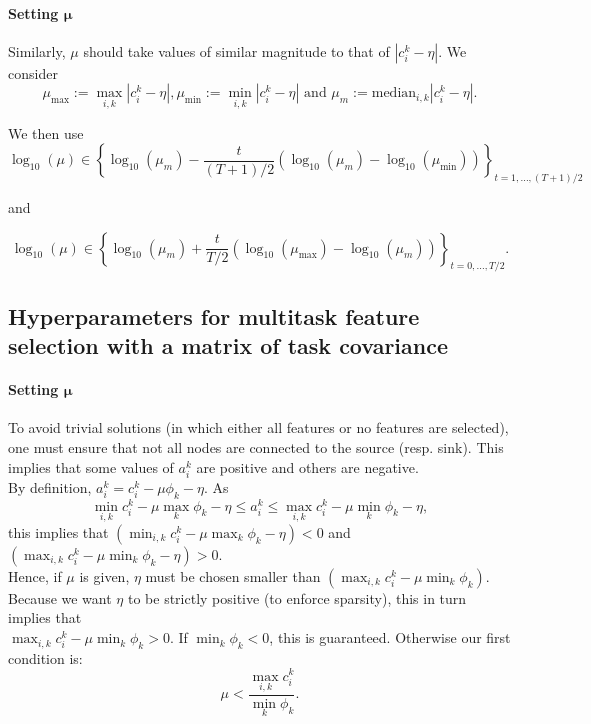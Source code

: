 \documentclass[12pt,a4paper]{article}
\begin{document}
\paragraph{Setting $\pmb{\mu}$} Similarly, $\mu$ should take values of similar magnitude to that of $|c_i^k - \eta|$. We consider 
\[
\mu_{\max} := \max_{i,k} |c_i^k - \eta|,
\mu_{\min} := \min_{i,k} |c_i^k - \eta| \mbox{ and }
\mu_{m} := \mbox{median}_{i, k} |c_i^k - \eta|.
\]

 We then use 
\[\boxed{
\log_{10}(\mu) \in \left \{ {\log_{10}(\mu_{m}) - \frac{t}{(T+1)/2} 
 \left (\log_{10}(\mu_{m}) - \log_{10}(\mu_{\min}) \right)} \right \}_{t = 1, \dots, (T+1)/2}}
\]

 and

\[\boxed{
\log_{10}(\mu) \in \left \{ {\log_{10}(\mu_{m}) + \frac{t}{T/2} 
\left (\log_{10}(\mu_{\max}) - \log_{10}(\mu_{m}) \right)} \right \}_{t = 0, \dots, T/2}}.
\]



\subsection{Hyperparameters for multitask feature selection with a matrix of task covariance}
\paragraph{Setting $\pmb{\mu}$} To avoid trivial solutions (in which either all features or no features are selected), one must ensure that not all nodes are connected to the source (resp. sink). This implies that some values of $a_i^k$ are positive and others are negative.\\

By definition, $a_i^k = c_i^k - \mu \phi_k - \eta$. As
\[
\min_{i, k} c_i^k - \mu \max_k \phi_k - \eta \leq 
  a_i^k   \leq \max_{i, k} c_i^k - \mu \min_k \phi_k - \eta,
\]
this implies that $(\min_{i, k} c_i^k - \mu \max_k \phi_k - \eta) < 0$ and
$(\max_{i, k} c_i^k - \mu \min_k \phi_k - \eta) > 0$.\\

Hence, if $\mu$ is given, $\eta$ must be chosen smaller than 
$( \max_{i, k} c_i^k - \mu \min_k \phi_k )$.\\

Because we want $\eta$ to be strictly positive (to enforce sparsity), this in turn implies that\\ $\max_{i, k} c_i^k - \mu \min_k \phi_k > 0$. If $\min_k \phi_k < 0$, this is guaranteed. Otherwise our first condition is:
\[ \mu < \frac{\max_{i, k} c_i^k}{\min_k \phi_k}.\]
\end{document}
